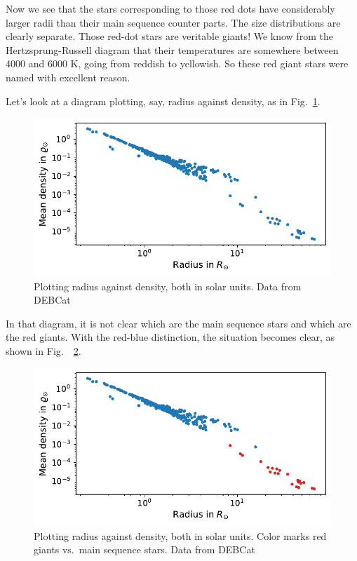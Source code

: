 \documentclass[twocolumn,apj]{openjournal}
\begin{document}
Now we see that the stars corresponding to those red dots have considerably larger radii than their main sequence counter parts. The size distributions are clearly separate. Those red-dot stars are veritable giants! We know from the Hertzsprung-Russell diagram that their temperatures are somewhere between 4000 and 6000 K, going from reddish to yellowish. So these red giant stars were named with excellent reason.

Let's look at a diagram plotting, say, radius against density, as in Fig.~\ref{RadDensMono}.
\begin{figure}[htbp]
\begin{center}
\includegraphics[width=\linewidth]{radius-dichte-sep-DEB-mono.pdf}
\caption{Plotting radius against density, both in solar units. Data from DEBCat}
\label{RadDensMono}
\end{center}
\end{figure}
In that diagram, it is not clear which are the main sequence stars and which are the red giants. With the red-blue distinction, the situation becomes clear, as shown in Fig.~~\ref{RadDensColor}.
\begin{figure}[htbp]
\begin{center}
\includegraphics[width=\linewidth]{radius-dichte-sep-DEB-redblue.pdf}
\caption{Plotting radius against density, both in solar units. Color marks red giants vs.\ main sequence stars. Data from DEBCat}
\label{RadDensColor}
\end{center}
\end{figure}
\end{document}
